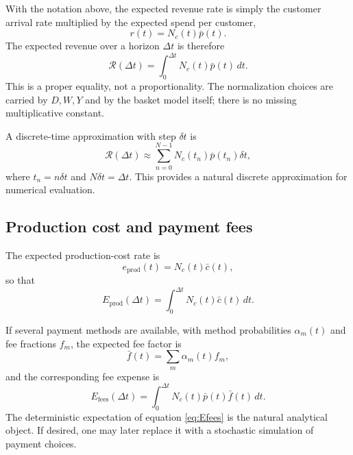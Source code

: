 \documentclass{article}
\begin{document}
With the notation above, the expected revenue rate is simply the customer arrival rate multiplied by the expected spend per customer,
\begin{equation}
\label{eq:revenue-rate}
    r(t) = N_c(t) \bar{p}(t).
\end{equation}
The expected revenue over a horizon \( \Delta t \) is therefore
\begin{equation}
\label{eq:revenue-total}
    \mathcal{R}(\Delta t) = \int_0^{\Delta t} N_c(t) \bar{p}(t) \, dt.
\end{equation}
This is a proper equality, not a proportionality. The normalization choices are carried by \( D, W, Y \) and by the basket model itself; there is no missing multiplicative constant.

A discrete-time approximation with step \( \delta t \) is
\begin{equation}
\label{eq:revenue-discrete}
    \mathcal{R}(\Delta t) \approx \sum_{n=0}^{N-1} N_c(t_n) \bar{p}(t_n) \delta t,
\end{equation}
where \( t_n = n \delta t \) and \( N \delta t = \Delta t \). This provides a natural discrete approximation for numerical evaluation.

\subsection{Production cost and payment fees}
\label{sec:costs-variable}

The expected production-cost rate is
\begin{equation}
\label{eq:Eprod}
    e_{\mathrm{prod}}(t) = N_c(t) \bar{c}(t),
\end{equation}
so that
\begin{equation}
\label{eq:Eprod-total}
    E_{\mathrm{prod}}(\Delta t) = \int_0^{\Delta t} N_c(t) \bar{c}(t) \, dt.
\end{equation}

If several payment methods are available, with method probabilities \( \alpha_m(t) \) and fee fractions \( f_m \), the expected fee factor is
\begin{equation}
\label{eq:fee-factor}
    \bar{f}(t) = \sum_m \alpha_m(t) f_m,
\end{equation}
and the corresponding fee expense is
\begin{equation}
\label{eq:Efees}
    E_{\mathrm{fees}}(\Delta t) = \int_0^{\Delta t} N_c(t) \bar{p}(t) \bar{f}(t) \, dt.
\end{equation}
The deterministic expectation of equation \ref{eq:Efees} is the natural analytical object. If desired, one may later replace it with a stochastic simulation of payment choices.
\end{document}
